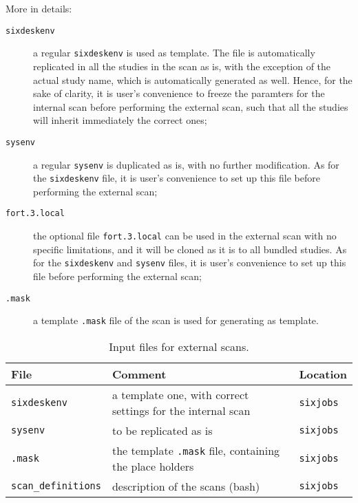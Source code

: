 More in details:
\begin{description}
\item[\texttt{sixdeskenv}] a regular \texttt{sixdeskenv} is used as template.
  The file is automatically replicated in all the studies in the scan as is,
  with the exception of the actual study name, which is automatically generated
  as well. Hence, for the sake of clarity,  it is user's convenience to freeze
  the paramters for the internal scan before performing the external scan,
  such that all the studies will inherit immediately the correct ones;
\item[\texttt{sysenv}] a regular \texttt{sysenv} is duplicated as is, with
  no further modification. As for the \texttt{sixdeskenv} file, 
  it is user's convenience to set up this file before performing the
  external scan;
\item[\texttt{fort.3.local}] the optional file \texttt{fort.3.local}
  can be used in the external scan with no specific limitations, and it
  will be cloned as it is to all bundled studies. As for the
  \texttt{sixdeskenv} and \texttt{sysenv} files, it is user's convenience
  to set up this file before performing the external scan;
\item[\texttt{.mask}] a template \texttt{.mask} file of the scan is used
  for generating as template.
\end{description}

\begin{table}[h]
\begin{center}
    \caption{Input files for external scans.}
    \label{tab:ExternalScanInputFile}
    \begin{tabular}{|l|l|l|}
    \hline
    \rowcolor{blue!30}
    \textbf{File} & \textbf{Comment} & \textbf{Location} \\
    \hline
    \texttt{sixdeskenv} & a template one, with correct settings for the internal scan & \texttt{sixjobs} \\
    \texttt{sysenv} & to be replicated as is & \texttt{sixjobs} \\
    \texttt{.mask} & the template \texttt{.mask} file, containing the place holders & \texttt{sixjobs} \\
    \texttt{scan\_definitions} & description of the scans (bash) & \texttt{sixjobs} \\
    \hline
    \end{tabular}
\end{center}
\end{table}
